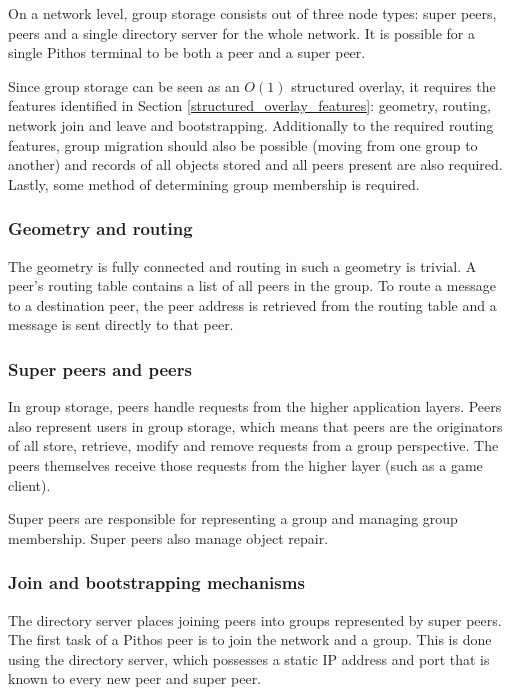On a network level, group storage consists out of three node types: super peers, peers and a single directory server for the whole network. It is possible for a single Pithos terminal to be both a peer and a super peer.

Since group storage can be seen as an $O(1)$ structured overlay, it requires the features identified in Section \ref{structured_overlay_features}: geometry, routing, network join and leave and bootstrapping. Additionally to the required routing features, group migration should also be possible (moving from one group to another) and records of all objects stored and all peers present are also required. Lastly, some method of determining group membership is required.

\subsubsection{Geometry and routing}

The geometry is fully connected and routing in such a geometry is trivial. A peer's routing table contains a list of all peers in the group. To route a message to a destination peer, the peer address is retrieved from the routing table and a message is sent directly to that peer.

\subsubsection{Super peers and peers}

In group storage, peers handle requests from the higher application layers. Peers also represent users in group storage, which means that peers are the originators of all store, retrieve, modify and remove requests from a group perspective. The peers themselves receive those requests from the higher layer (such as a game client).

Super peers are responsible for representing a group and managing group membership. Super peers also manage object repair.

\subsubsection{Join and bootstrapping mechanisms}
\label{join_mechanism_design}

The directory server places joining peers into groups represented by super peers. The first task of a Pithos peer is to join the network and a group. This is done using the directory server, which possesses a static IP address and port that is known to every new peer and super peer.

